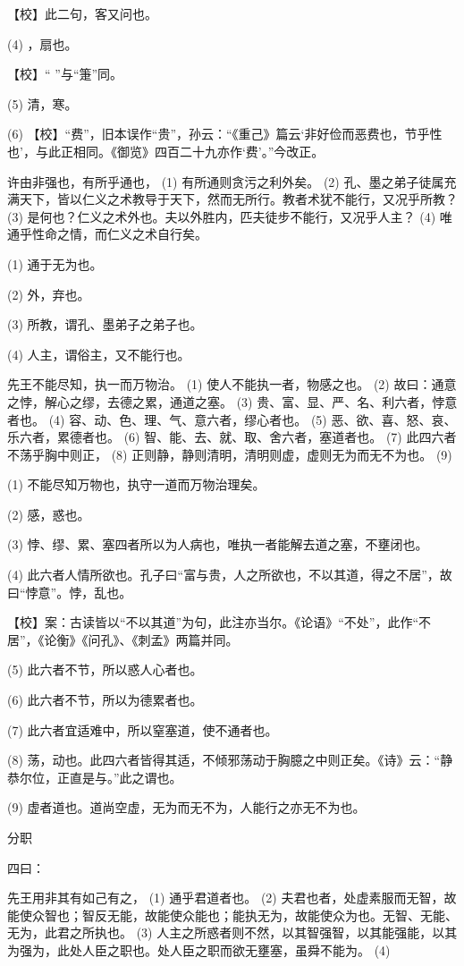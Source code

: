 \documentclass[12pt,UTF8]{ctexbook}
\begin{document}
【校】此二句，客又问也。

(4) ，扇也。

【校】“ ”与“箑”同。

(5) 清，寒。

(6) 【校】“费”，旧本误作“贵”，孙云：“《重己》篇云‘非好俭而恶费也，节乎性也’，与此正相同。《御览》四百二十九亦作‘费’。”今改正。

许由非强也，有所乎通也， (1) 有所通则贪污之利外矣。 (2) 孔、墨之弟子徒属充满天下，皆以仁义之术教导于天下，然而无所行。教者术犹不能行，又况乎所教？ (3) 是何也？仁义之术外也。夫以外胜内，匹夫徒步不能行，又况乎人主？ (4) 唯通乎性命之情，而仁义之术自行矣。

(1) 通于无为也。

(2) 外，弃也。

(3) 所教，谓孔、墨弟子之弟子也。

(4) 人主，谓俗主，又不能行也。

先王不能尽知，执一而万物治。 (1) 使人不能执一者，物感之也。 (2) 故曰：通意之悖，解心之缪，去德之累，通道之塞。 (3) 贵、富、显、严、名、利六者，悖意者也。 (4) 容、动、色、理、气、意六者，缪心者也。 (5) 恶、欲、喜、怒、哀、乐六者，累德者也。 (6) 智、能、去、就、取、舍六者，塞道者也。 (7) 此四六者不荡乎胸中则正， (8) 正则静，静则清明，清明则虚，虚则无为而无不为也。 (9)

(1) 不能尽知万物也，执守一道而万物治理矣。

(2) 感，惑也。

(3) 悖、缪、累、塞四者所以为人病也，唯执一者能解去道之塞，不壅闭也。

(4) 此六者人情所欲也。孔子曰“富与贵，人之所欲也，不以其道，得之不居”，故曰“悖意”。悖，乱也。

【校】案：古读皆以“不以其道”为句，此注亦当尔。《论语》“不处”，此作“不居”，《论衡》《问孔》、《刺孟》两篇并同。

(5) 此六者不节，所以惑人心者也。

(6) 此六者不节，所以为德累者也。

(7) 此六者宜适难中，所以窒塞道，使不通者也。

(8) 荡，动也。此四六者皆得其适，不倾邪荡动于胸臆之中则正矣。《诗》云：“静恭尔位，正直是与。”此之谓也。

(9) 虚者道也。道尚空虚，无为而无不为，人能行之亦无不为也。





分职


四曰：

先王用非其有如己有之， (1) 通乎君道者也。 (2) 夫君也者，处虚素服而无智，故能使众智也；智反无能，故能使众能也；能执无为，故能使众为也。无智、无能、无为，此君之所执也。 (3) 人主之所惑者则不然，以其智强智，以其能强能，以其为强为，此处人臣之职也。处人臣之职而欲无壅塞，虽舜不能为。 (4)
\end{document}
